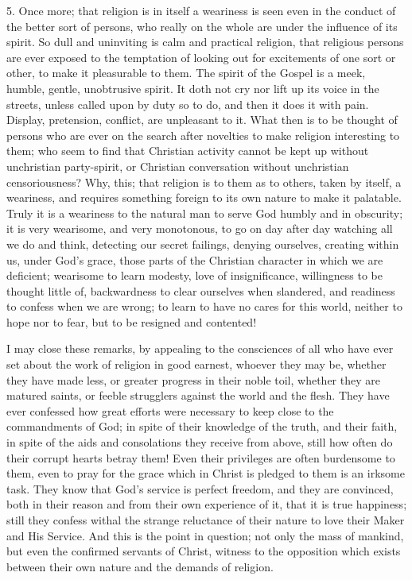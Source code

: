 5. Once more; that religion is in itself a weariness is seen even
in the conduct of the better sort of persons, who really on the whole
are under the influence of its spirit. So dull and uninviting is calm
and practical religion, that religious persons are ever exposed to the
temptation of looking out for excitements of one sort or other, to
make it pleasurable to them. The spirit of the Gospel is a meek,
humble, gentle, unobtrusive spirit. It doth not cry nor lift up its
voice in the streets, unless called upon by duty so to do, and then it
does it with pain. Display, pretension, conflict, are unpleasant to
it. What then is to be thought of persons who are ever on the search
after novelties to make religion interesting to them; who seem to find
that Christian activity cannot be kept up without unchristian
party-spirit, or Christian conversation without unchristian
censoriousness? Why, this; that religion is to them as to others,
taken by itself, a weariness, and requires something foreign to its
own nature to make it palatable. Truly it is a weariness to the
natural man to serve God humbly and in obscurity; it is very
wearisome, and very monotonous, to go on day after day watching all we
do and think, detecting our secret failings, denying ourselves,
creating within us, under God's grace, those parts of the Christian
character in which we are deficient; wearisome to learn modesty, love
of insignificance, willingness to be thought little of, backwardness
to clear ourselves when slandered, and readiness to confess when we
are wrong; to learn to have no cares for this world, neither to hope
nor to fear, but to be resigned and contented!

I may close these remarks, by appealing to the consciences of all
who have ever set about the work of religion in good earnest, whoever
they may be, whether they have made less, or greater progress in their
noble toil, whether they are matured saints, or feeble strugglers
against the world and the flesh. They have ever confessed how great
efforts were necessary to keep close to the commandments of God; in
spite of their knowledge of the truth, and their faith, in spite of
the aids and consolations they receive from above, still how often do
their corrupt hearts betray them! Even their privileges are often
burdensome to them, even to pray for the grace which in Christ is
pledged to them is an irksome task. They know that God's service is
perfect freedom, and they are convinced, both in their reason and from
their own experience of it, that it is true happiness; still they
confess withal the strange reluctance of their nature to love their
Maker and His Service. And this is the point in question; not only the
mass of mankind, but even the confirmed servants of Christ, witness to
the opposition which exists between their own nature and the demands
of religion.

